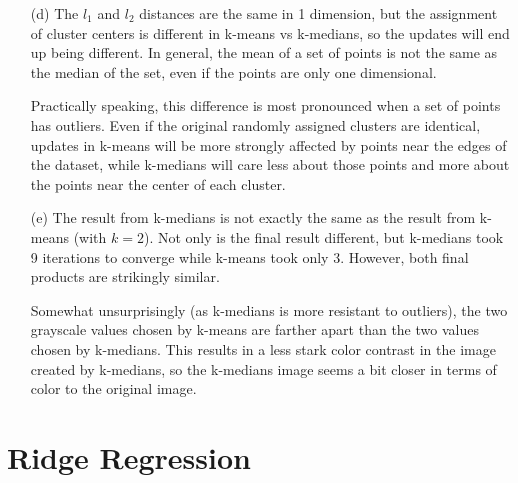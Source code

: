 \documentclass{article}
\begin{document}
\begin{enumerate}
\begin{minipage}{\linewidth}
\begin{algorithm}[H]
{				
                        }
                        \caption{K-medians}
                \end{algorithm}
                \end{minipage}

	\item[(d)]
		The $l_1$ and $l_2$ distances are the same in 1 dimension, but the assignment of cluster centers is different in k-means vs k-medians, so the updates will end up being different. In general, the mean of a set of points is not the same as the median of the set, even if the points are only one dimensional.

Practically speaking, this difference is most pronounced when a set of points has outliers. Even if the original randomly assigned clusters are identical, updates in k-means will be more strongly affected by points near the edges of the dataset, while k-medians will care less about those points and more about the points near the center of each cluster.
	
	\item[(e)]
		The result from k-medians is not exactly the same as the result from k-means (with $k=2$). Not only is the final result different, but k-medians took 9 iterations to converge while k-means took only 3. However, both final products are strikingly similar.

Somewhat unsurprisingly (as k-medians is more resistant to outliers), the two grayscale values chosen by k-means are farther apart than the two values chosen by k-medians. This results in a less stark color contrast in the image created by k-medians, so the k-medians image seems a bit closer in terms of color to the original image.
\end{enumerate}


\section{Ridge Regression}
\end{document}
